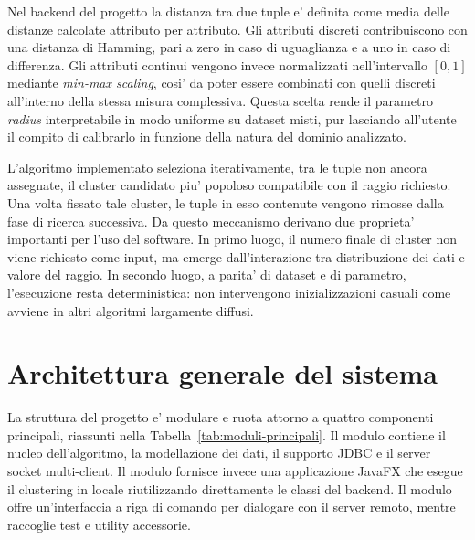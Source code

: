 Nel backend del progetto la distanza tra due tuple e' definita come media delle distanze
calcolate attributo per attributo. Gli attributi discreti contribuiscono con una distanza
di Hamming, pari a zero in caso di uguaglianza e a uno in caso di differenza. Gli
attributi continui vengono invece normalizzati nell'intervallo $[0,1]$ mediante
\emph{min-max scaling}, cosi' da poter essere combinati con quelli discreti all'interno
della stessa misura complessiva. Questa scelta rende il parametro \emph{radius}
interpretabile in modo uniforme su dataset misti, pur lasciando all'utente il compito di
calibrarlo in funzione della natura del dominio analizzato.

L'algoritmo implementato seleziona iterativamente, tra le tuple non ancora assegnate, il
cluster candidato piu' popoloso compatibile con il raggio richiesto. Una volta fissato
tale cluster, le tuple in esso contenute vengono rimosse dalla fase di ricerca
successiva. Da questo meccanismo derivano due proprieta' importanti per l'uso del
software. In primo luogo, il numero finale di cluster non viene richiesto come input, ma
emerge dall'interazione tra distribuzione dei dati e valore del raggio. In secondo luogo,
a parita' di dataset e di parametro, l'esecuzione resta deterministica: non intervengono
inizializzazioni casuali come avviene in altri algoritmi largamente diffusi.

\section{Architettura generale del sistema}

La struttura del progetto e' modulare e ruota attorno a quattro componenti principali,
riassunti nella Tabella~\ref{tab:moduli-principali}. Il modulo  contiene
il nucleo dell'algoritmo, la modellazione dei dati, il supporto JDBC e il server socket
multi-client. Il modulo  fornisce invece una applicazione JavaFX che esegue
il clustering in locale riutilizzando direttamente le classi del backend. Il modulo
 offre un'interfaccia a riga di comando per dialogare con il server
remoto, mentre  raccoglie test e utility accessorie.

